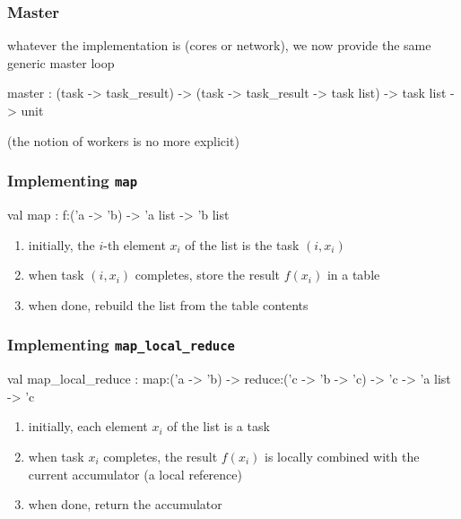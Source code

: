 \documentclass{beamer}
\let\emph\alert
\begin{document}
\begin{frame}\frametitle{Master}
  whatever the implementation is (cores or network), we now 
  provide the same generic master loop


  \begin{ocaml}
    master : (task -> task_result) -> 
             (task -> task_result -> task list) ->
             task list -> 
             unit
  \end{ocaml}


  (the notion of workers is no more explicit)
\end{frame}

\begin{frame}\frametitle{Implementing \texttt{map}}
  \begin{ocaml}
val map : f:('a -> 'b) -> 'a list -> 'b list
  \end{ocaml}



  \begin{enumerate}
  \item initially, the $i$-th element $x_i$ of the list is the task $(i,x_i)$
  \item when task $(i,x_i)$ completes, store the result $f(x_i)$ in a table
  \item when done, rebuild the list from the table contents
  \end{enumerate}
\end{frame}

\begin{frame}\frametitle{Implementing \texttt{map\_local\_reduce}}
  \begin{ocaml}
 val map_local_reduce :
  map:('a -> 'b) -> reduce:('c -> 'b -> 'c) -> 
  'c -> 'a list -> 'c
  \end{ocaml}



  \begin{enumerate}
  \item initially, each element $x_i$ of the list is a task
  \item when task $x_i$ completes, the result $f(x_i)$ is
    \emph{locally} combined with the current accumulator (a local reference)
  \item when done, return the accumulator
  \end{enumerate}
\end{frame}
\end{document}
